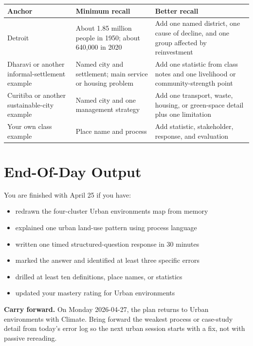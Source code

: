 \documentclass[11pt,a4paper]{article}
\newcommand{\boxnote}[3]{%
\noindent\colorbox{#1}{%
  \begin{minipage}{0.965\textwidth}
  \sffamily
  \textbf{\textcolor{HeadingBlue}{#2}} #3
  \end{minipage}
}}
\begin{document}
\begin{tabularx}{\textwidth}{L{0.25\textwidth}Y Y}
\toprule
\textbf{Anchor} & \textbf{Minimum recall} & \textbf{Better recall} \\
\midrule
Detroit & About 1.85 million people in 1950; about 640,000 in 2020 & Add one
named district, one cause of decline, and one group affected by reinvestment \\
Dharavi or another informal-settlement example & Named city and settlement;
main service or housing problem & Add one statistic from class notes and one
livelihood or community-strength point \\
Curitiba or another sustainable-city example & Named city and one management
strategy & Add one transport, waste, housing, or green-space detail plus one
limitation \\
Your own class example & Place name and process & Add statistic, stakeholder,
response, and evaluation \\
\bottomrule
\end{tabularx}

\section{End-Of-Day Output}

You are finished with April 25 if you have:

\begin{itemize}
  \item redrawn the four-cluster Urban environments map from memory
  \item explained one urban land-use pattern using process language
  \item written one timed structured-question response in 30 minutes
  \item marked the answer and identified at least three specific errors
  \item drilled at least ten definitions, place names, or statistics
  \item updated your mastery rating for Urban environments
\end{itemize}

\boxnote{SoftGreen}{Carry forward.}{On Monday 2026-04-27, the plan returns to
Urban environments with Climate. Bring forward the weakest process or case-study
detail from today's error log so the next urban session starts with a fix, not
with passive rereading.}
\end{document}
